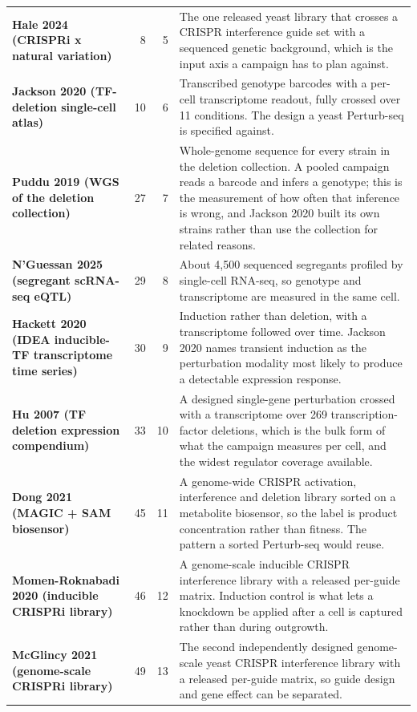 \begin{longtable}{@{}L{46mm} r@{\hspace{6pt}} r@{\hspace{6pt}} L{104mm}@{}}
\addlinespace[5pt]
\textbf{Hale 2024 (CRISPRi x natural variation)} & 8 & 5 & The one released yeast library that crosses a CRISPR interference guide set with a sequenced genetic background, which is the input axis a campaign has to plan against. \\
\addlinespace[5pt]
\textbf{Jackson 2020 (TF-deletion single-cell atlas)} & 10 & 6 & Transcribed genotype barcodes with a per-cell transcriptome readout, fully crossed over 11 conditions. The design a yeast Perturb-seq is specified against. \\
\addlinespace[5pt]
\textbf{Puddu 2019 (WGS of the deletion collection)} & 27 & 7 & Whole-genome sequence for every strain in the deletion collection. A pooled campaign reads a barcode and infers a genotype; this is the measurement of how often that inference is wrong, and Jackson 2020 built its own strains rather than use the collection for related reasons. \\
\addlinespace[5pt]
\textbf{N'Guessan 2025 (segregant scRNA-seq eQTL)} & 29 & 8 & About 4,500 sequenced segregants profiled by single-cell RNA-seq, so genotype and transcriptome are measured in the same cell. \\
\addlinespace[5pt]
\textbf{Hackett 2020 (IDEA inducible-TF transcriptome time series)} & 30 & 9 & Induction rather than deletion, with a transcriptome followed over time. Jackson 2020 names transient induction as the perturbation modality most likely to produce a detectable expression response. \\
\addlinespace[5pt]
\textbf{Hu 2007 (TF deletion expression compendium)} & 33 & 10 & A designed single-gene perturbation crossed with a transcriptome over 269 transcription-factor deletions, which is the bulk form of what the campaign measures per cell, and the widest regulator coverage available. \\
\addlinespace[5pt]
\textbf{Dong 2021 (MAGIC + SAM biosensor)} & 45 & 11 & A genome-wide CRISPR activation, interference and deletion library sorted on a metabolite biosensor, so the label is product concentration rather than fitness. The pattern a sorted Perturb-seq would reuse. \\
\addlinespace[5pt]
\textbf{Momen-Roknabadi 2020 (inducible CRISPRi library)} & 46 & 12 & A genome-scale inducible CRISPR interference library with a released per-guide matrix. Induction control is what lets a knockdown be applied after a cell is captured rather than during outgrowth. \\
\addlinespace[5pt]
\textbf{McGlincy 2021 (genome-scale CRISPRi library)} & 49 & 13 & The second independently designed genome-scale yeast CRISPR interference library with a released per-guide matrix, so guide design and gene effect can be separated. \\

\end{longtable}
